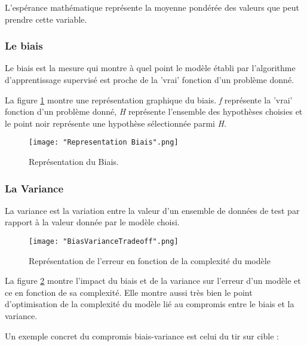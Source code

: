\documentclass[a4paper]{article}
\begin{document}
L'espérance mathématique représente la moyenne pondérée des valeurs que peut prendre cette variable. 

\newpage

\subsubsection{Le biais}
Le biais est la mesure qui montre à quel point le modèle établi par l'algorithme d'apprentissage supervisé est proche de la 'vrai' fonction d'un problème donné. \newline

La figure \ref{BiasRepresentation} montre une représentation graphique du biais. \textit{f} représente la 'vrai' fonction d'un problème donné, \textit{H} représente l'ensemble des hypothèses choisies et le point noir représente une hypothèse sélectionnée parmi \textit{H}. \newline

\begin{figure}[!h]
	\centering
	\texttt{[image: "Representation Biais".png]}
	\caption{Représentation du Biais.}
	\cite{BiasVarianceTradeoffTextbooksUpdate}
	\label{BiasRepresentation}
\end{figure}

\subsubsection{La Variance}

La variance est la variation entre la valeur d'un ensemble de données de test par rapport à la valeur donnée par le modèle choisi. 

\newpage

\begin{figure}[!h]
	\centering
	\texttt{[image: "BiasVarianceTradeoff".png]}
	\caption{Représentation de l'erreur en fonction de la complexité du modèle}
	\cite{BiasVarianceTradeoffTextbooksUpdate}
	\label{TradeoffRepresentation}
\end{figure}

La figure \ref{TradeoffRepresentation} montre l'impact du biais et de la variance sur l'erreur d'un modèle et ce en fonction de sa complexité. Elle montre aussi très bien le point d'optimisation de la complexité du modèle lié au compromis entre le biais et la variance.

\newpage

Un exemple concret du compromis biais-variance est celui du tir sur cible :
\end{document}
